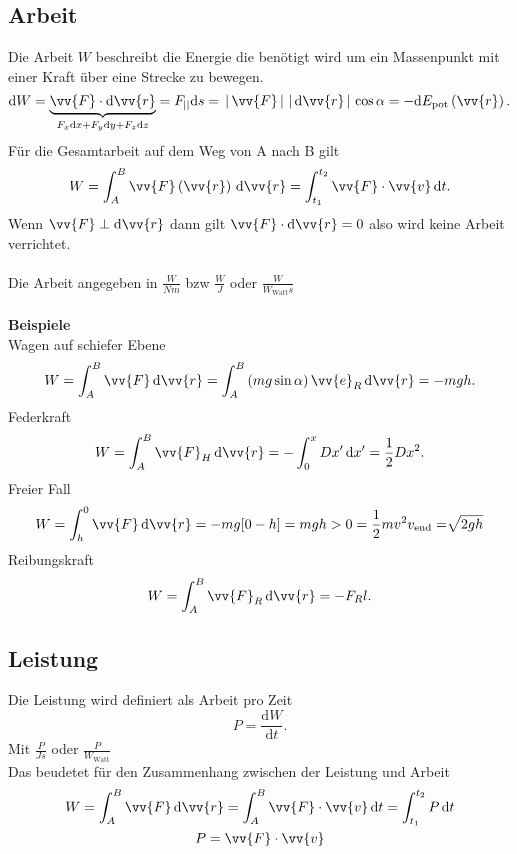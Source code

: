 \documentclass[a4paper,12pt]{article}
\newcommand{\td}{\,\text{d}}
\numberwithin{equation}{section}
\begin{document}
\subsection{Arbeit}
Die Arbeit $W$ beschreibt die Energie die benötigt wird um ein Massenpunkt mit einer Kraft über eine Strecke zu bewegen.
\[ 
        \text{d}W=\underbrace{\vv{F}\cdot \text{d}\vv{r}}_{F_x\text{d}x+F_y\text{d}y+F_z\text{d}z}=F_{||}\text{d}s=\,|\, \vv{F}\,|\, \,|\, \text{d}\vv{r}\,|\, \cos \alpha =-\text{d}E_{\text{pot}}\left(\vv{r}\right)
.\] 
Für die Gesamtarbeit auf dem Weg von A nach B gilt
\[ 
        W=\int_{A}^{B}\vv{F}\left(\vv{r}\right)\td\vv{r}=\int_{t_1}^{t_2}\vv{F}\cdot \vv{v}\td t
.\] 
Wenn $\vv{F}\perp \text{d}\vv{r}$ dann gilt $\vv{F}\cdot \text{d}\vv{r}=0$ also wird keine Arbeit verrichtet.\\\\
Die Arbeit angegeben in $\tfrac{W}{Nm}$ bzw $\tfrac{W}{J}$ oder $\tfrac{W}{W_{\text{Watt}}s}$ 
\\\hfill\\\textbf{Beispiele}\\ 
Wagen auf schiefer Ebene
\[ 
        W=\int_{A}^{B}\vv{F}\td\vv{r}=\int_{A}^{B}\left(mg\sin \alpha \right)\vv{e}_R\td\vv{r}=-mgh
.\] 
Federkraft
\[ 
        W=\int_{A}^{B}\vv{F}_H\td\vv{r}=-\int_{0}^{x}Dx'\td x'=\dfrac{1}{2}Dx^2
.\] 
Freier Fall
\begin{gather*}
        W=\int_{h}^{0}\vv{F}\td\vv{r}=-mg[0-h]=mgh>0=\dfrac{1}{2}mv^2
        v_{\text{end}}=\sqrt[]{2gh} 
\end{gather*}
Reibungskraft
\[ 
        W=\int_{A}^{B}\vv{F}_R\td\vv{r}=-F_Rl
.\] 

\subsection{Leistung}
Die Leistung wird definiert als Arbeit pro Zeit
\[ 
        P=\dfrac{\text{d}W}{\text{d}t}
.\] 
Mit $\tfrac{P}{Js}$ oder $\tfrac{P}{W_{\text{Watt} }}$\\
Das beudetet für den Zusammenhang zwischen der Leistung und Arbeit
\begin{gather*}
        W=\int_{A}^{B}\vv{F}\td\vv{r}=\int_{A}^{B}\vv{F}\cdot \vv{v}\td t=\int_{t_1}^{t_2}P\td t\\
        P=\vv{F}\cdot \vv{v}
\end{gather*}
\end{document}
